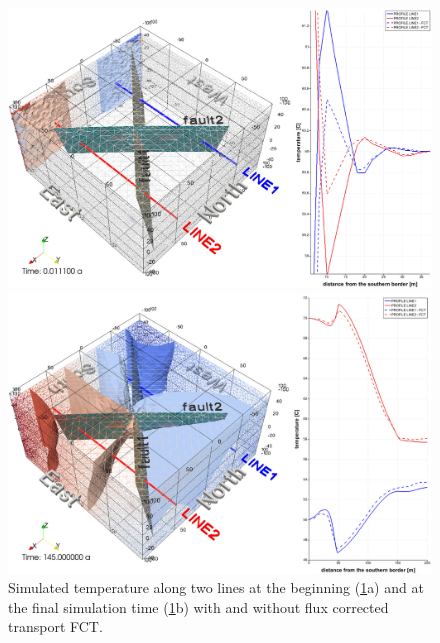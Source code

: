 \begin{figure}[htbp]
    \begin{center}
        \begin{minipage}{0.72\textwidth}
            \includegraphics[width=1\textwidth]{T/figures/2u2f_fig7a.eps}
        \end{minipage}
        \begin{minipage}{0.72\textwidth}
            \includegraphics[width=1\textwidth]{T/figures/2u2f_fig7b.eps}
        \end{minipage}
        \caption{Simulated temperature along two lines at the beginning (\ref{fig7}a) and at the final simulation time (\ref{fig7}b) with and without flux corrected transport FCT.}
        \label{fig7}
    \end{center}
\end{figure}


